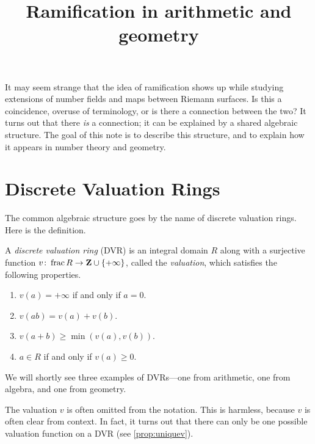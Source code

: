 \documentclass[12pt]{article}
\title{Ramification in arithmetic and geometry}
\DeclareMathOperator{\f}{frac}
\begin{document}
\maketitle

It may seem strange that the idea of ramification shows up while studying extensions of number fields and maps between Riemann surfaces.
Is this a coincidence, overuse of terminology, or is there a connection between the two?
It turns out that there \emph{is} a connection; it can be explained by a shared algebraic structure.
The goal of this note is to describe this structure, and to explain how it appears in number theory and geometry.

\section{Discrete Valuation Rings}
The common algebraic structure goes by the name of discrete valuation rings.
Here is the definition.
\begin{definition}
  A \emph{discrete valuation ring} (DVR) is an integral domain $R$ along with a surjective function $v \from \f R \to \Z \cup \{+\infty\}$, called the \emph{valuation}, which satisfies the following properties.
  \begin{enumerate}
  \item $v(a) = +\infty$ if and only if $a = 0$.
  \item $v(ab) = v(a) + v(b)$.
  \item $v(a+b) \geq \min(v(a), v(b))$.
  \item $a \in R$ if and only if $v(a) \geq 0$.
  \end{enumerate}
\end{definition}
We will shortly see three examples of DVRs---one from arithmetic, one from algebra, and one from geometry.

The valuation $v$ is often omitted from the notation.
This is harmless, because $v$ is often clear from context.
In fact, it turns out that there can only be one possible valuation function on a DVR (see \autoref{prop:uniquev}).
\end{document}
